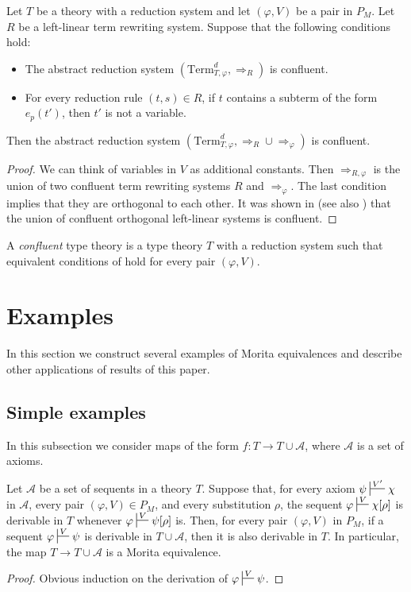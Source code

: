 \documentclass[reqno]{amsart}
\theoremstyle{definition}
\theoremstyle{remark}
\newcommand{\Term}{\mathrm{Term}}
\numberwithin{figure}{section}
\begin{document}
\begin{lem}
Let $T$ be a theory with a reduction system and let $(\varphi,V)$ be a pair in $P_M$.
Let $R$ be a left-linear term rewriting system.
Suppose that the following conditions hold:
\begin{itemize}
\item The abstract reduction system $(\Term_{T,\varphi}^d,\Rightarrow_R)$ is confluent.
\item For every reduction rule $(t,s) \in R$, if $t$ contains a subterm of the form $e_p(t')$, then $t'$ is not a variable.
\end{itemize}
Then the abstract reduction system $(\Term_{T,\varphi}^d, \Rightarrow_R \cup \Rightarrow_\varphi)$ is confluent.
\end{lem}
\begin{proof}
We can think of variables in $V$ as additional constants.
Then $\Rightarrow_{R,\varphi}$ is the union of two confluent term rewriting systems $R$ and $\Rightarrow_\varphi$.
The last condition implies that they are orthogonal to each other.
It was shown in \cite{raoult} (see also \cite[Theorem~8.6.35]{ohlebusch-advanced}) that the union of confluent orthogonal left-linear systems is confluent.
\end{proof}

\begin{defn}[confluent]
A \emph{confluent} type theory is a type theory $T$ with a reduction system such that equivalent conditions of  hold for every pair $(\varphi,V)$.
\end{defn}

\section{Examples}

In this section we construct several examples of Morita equivalences and describe other applications of results of this paper.

\subsection{Simple examples}

In this subsection we consider maps of the form $f : T \to T \cup \mathcal{A}$, where $\mathcal{A}$ is a set of axioms.

\begin{prop}
Let $\mathcal{A}$ be a set of sequents in a theory $T$.
Suppose that, for every axiom $\psi \sststile{}{V'} \chi$ in $\mathcal{A}$, every pair $(\varphi,V) \in P_M$, and every substitution $\rho$,
the sequent $\varphi \sststile{}{V} \chi[\rho]$ is derivable in $T$ whenever $\varphi \sststile{}{V} \psi[\rho]$ is.
Then, for every pair $(\varphi,V)$ in $P_M$, if a sequent $\varphi \sststile{}{V} \psi$ is derivable in $T \cup \mathcal{A}$, then it is also derivable in $T$.
In particular, the map $T \to T \cup \mathcal{A}$ is a Morita equivalence.
\end{prop}
\begin{proof}
Obvious induction on the derivation of $\varphi \sststile{}{V} \psi$.
\end{proof}
\end{document}
